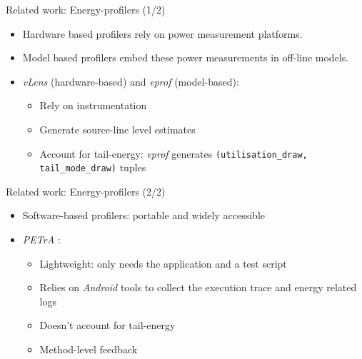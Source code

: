 %
%
\begin{frame}{Related work: Energy-profilers (1/2)}
\begin{itemize}
\item \alert{Hardware based} profilers rely on power measurement platforms.
\item \alert{Model based} profilers embed these power measurements in off-line models.
\item \textit{vLens} \cite{li2013calculating} (hardware-based) and \textit{eprof} \cite{pathak2012energy} (model-based):
\begin{itemize}
\item Rely on instrumentation
\item Generate \alert{source-line level estimates}
\item Account for \alert{tail-energy}: \textit{eprof} generates \texttt{(utilisation\_draw, 
tail\_mode\_draw)} tuples
\end{itemize}
\end{itemize}
\end{frame}
%
\begin{frame}{Related work: Energy-profilers (2/2)}
\begin{itemize}
\item \alert{Software-based} profilers: portable and widely accessible
\item \textit{PETrA} \cite{petra}:
\begin{itemize}
\item Lightweight: only needs the application and a test script
\item \alert{Relies on \textit{Android}} tools to collect the execution trace and energy related logs
\item Doesn't account for tail-energy
\item \alert{Method-level} feedback
\end{itemize}
\end{itemize}
\end{frame}
